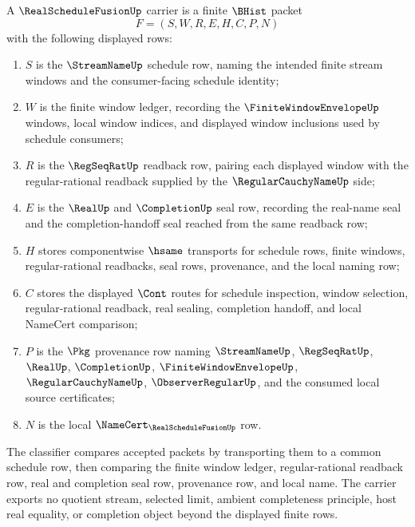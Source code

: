 \begin{definition}
\label{def:realschedulefusion-carrier}
A $\RealScheduleFusionUp$ carrier is a finite $\BHist$ packet
$$
F=(S,W,R,E,H,C,P,N)
$$
with the following displayed rows:
\begin{enumerate}
\item $S$ is the $\StreamNameUp$ schedule row, naming the intended finite stream windows and the consumer-facing schedule identity;
\item $W$ is the finite window ledger, recording the $\FiniteWindowEnvelopeUp$ windows, local window indices, and displayed window inclusions used by schedule consumers;
\item $R$ is the $\RegSeqRatUp$ readback row, pairing each displayed window with the regular-rational readback supplied by the $\RegularCauchyNameUp$ side;
\item $E$ is the $\RealUp$ and $\CompletionUp$ seal row, recording the real-name seal and the completion-handoff seal reached from the same readback row;
\item $H$ stores componentwise $\hsame$ transports for schedule rows, finite windows, regular-rational readbacks, seal rows, provenance, and the local naming row;
\item $C$ stores the displayed $\Cont$ routes for schedule inspection, window selection, regular-rational readback, real sealing, completion handoff, and local NameCert comparison;
\item $P$ is the $\Pkg$ provenance row naming $\StreamNameUp$, $\RegSeqRatUp$, $\RealUp$, $\CompletionUp$, $\FiniteWindowEnvelopeUp$, $\RegularCauchyNameUp$, $\ObserverRegularUp$, and the consumed local source certificates;
\item $N$ is the local $\NameCert_{\RealScheduleFusionUp}$ row.
\end{enumerate}
The classifier compares accepted packets by transporting them to a common schedule row, then comparing the finite window ledger, regular-rational readback row, real and completion seal row, provenance row, and local name. The carrier exports no quotient stream, selected limit, ambient completeness principle, host real equality, or completion object beyond the displayed finite rows.
\end{definition}

